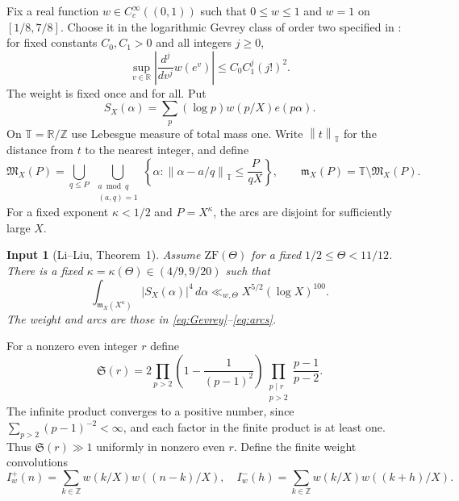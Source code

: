 \documentclass[11pt]{article}
\newtheorem{inputthm}[theorem]{Input}
\theoremstyle{definition}
\theoremstyle{remark}
\numberwithin{equation}{section}
\newcommand{\Z}{\mathbb Z}
\newcommand{\R}{\mathbb R}
\newcommand{\T}{\mathbb T}
\newcommand{\M}{\mathfrak M}
\newcommand{\m}{\mathfrak m}
\newcommand{\abs}[1]{\left\lvert#1\right\rvert}
\newcommand{\norm}[1]{\left\lVert#1\right\rVert}
\begin{document}
Fix a real function $w\in C_c^\infty((0,1))$ such that $0\le w\le1$
and $w=1$ on $[1/8,7/8]$. Choose it in the logarithmic Gevrey class
of order two specified in \cite[\S2]{LL}: for fixed constants
$C_0,C_1>0$ and all integers $j\ge0$,
\begin{equation}\label{eq:Gevrey}
 \sup_{v\in\R}\abs{\frac{d^j}{dv^j}w(e^v)}
             \le C_0C_1^j(j!)^2.
\end{equation}
The weight is fixed once and for all. Put
\begin{equation}\label{eq:prime-sum}
 S_X(\alpha)=\sum_p(\log p)w(p/X)e(p\alpha).
\end{equation}
On $\T=\R/\Z$ use Lebesgue measure of total mass one. Write
$\norm{t}_\T$ for the distance from $t$ to the nearest integer, and define
\begin{equation}\label{eq:arcs}
 \M_X(P)=\bigcup_{q\le P}\ \bigcup_{\substack{a\bmod q\\(a,q)=1}}
 \left\{\alpha:\norm{\alpha-a/q}_{\T}\le\frac{P}{qX}\right\},
 \qquad \m_X(P)=\T\setminus\M_X(P).
\end{equation}
For a fixed exponent $\kappa<1/2$ and $P=X^\kappa$, the arcs are
disjoint for sufficiently large $X$.

\begin{inputthm}[Li--Liu, Theorem~1]\label{input:LL4}
Assume $\mathrm{ZF}(\Theta)$ for a fixed $1/2\le\Theta<11/12$.
There is a fixed $\kappa=\kappa(\Theta)\in(4/9,9/20)$ such that
\begin{equation}\label{eq:LL4}
 \int_{\m_X(X^\kappa)}|S_X(\alpha)|^4\,d\alpha
                   \ll_{w,\Theta}X^{5/2}(\log X)^{100}.
\end{equation}
The weight and arcs are those in \eqref{eq:Gevrey}--\eqref{eq:arcs}.
\end{inputthm}

For a nonzero even integer $r$ define
\begin{equation}\label{eq:singularseries}
 \mathfrak S(r)=2\prod_{p>2}\left(1-\frac1{(p-1)^2}\right)
                  \prod_{\substack{p\mid r\\p>2}}\frac{p-1}{p-2}.
\end{equation}
The infinite product converges to a positive number, since
$\sum_{p>2}(p-1)^{-2}<\infty$, and each factor in the finite product
is at least one. Thus $\mathfrak S(r)\gg1$ uniformly in nonzero even $r$.
Define the finite weight convolutions
\begin{equation}\label{eq:Iw}
 I_w^+(n)=\sum_{k\in\Z}w(k/X)w((n-k)/X),\quad
 I_w^-(h)=\sum_{k\in\Z}w(k/X)w((k+h)/X).
\end{equation}
\end{document}
